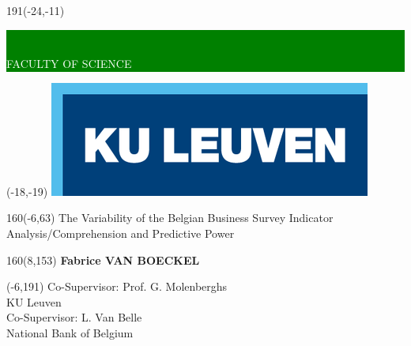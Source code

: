 \documentclass[12pt,a4paper,oneside]{book}
\begin{document}
\thispagestyle{empty}
\newcommand{\form}[1]{\scalebox{1.087}{\boldmath{#1}}}
\sffamily
%
\begin{textblock}{191}(-24,-11)
\colorbox{green}{\hspace{139mm}\ \parbox[c][18truemm]{52mm}{\textcolor{white}{FACULTY OF SCIENCE}}}
\end{textblock}
%
\begin{textblock}{70}(-18,-19)
\textblockcolour{}
\includegraphics*[height=19.8truemm]{Images/LogoKULeuven.png}
\end{textblock}
%
\begin{textblock}{160}(-6,63)
\textblockcolour{}
\vspace{-\parskip}
\flushleft
\fontsize{40}{42}\selectfont \textcolor{bluetitle}{The Variability of the Belgian Business Survey Indicator}\\[1.5mm]
\fontsize{20}{22}\selectfont Analysis/Comprehension and Predictive Power
\end{textblock}
%
%
\begin{textblock}{160}(8,153)
\textblockcolour{}
\vspace{-\parskip}
\flushright
\fontsize{14}{16}\selectfont \textbf{Fabrice VAN BOECKEL}
\end{textblock}
%
\begin{textblock}{70}(-6,191)
\textblockcolour{}
\vspace{-\parskip}
\flushleft
Co-Supervisor: Prof. G. Molenberghs\\[-2pt]
\textcolor{blueaff}{KU Leuven}\\[5pt]
Co-Supervisor: L. Van Belle\\[-2pt]
\textcolor{blueaff}{National Bank of Belgium}\\[5pt]
\end{textblock}
\end{document}
